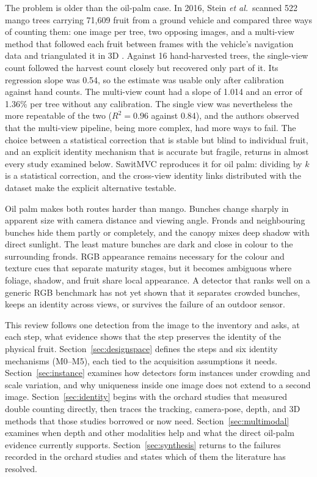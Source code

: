 The problem is older than the oil-palm case. In 2016, Stein \textit{et al.}\ scanned 522 mango trees carrying 71{,}609 fruit from a ground vehicle and compared three ways of counting them: one image per tree, two opposing images, and a multi-view method that followed each fruit between frames with the vehicle's navigation data and triangulated it in 3D \cite{ledger_r_408d13511cac4177}. Against 16 hand-harvested trees, the single-view count followed the harvest count closely but recovered only part of it. Its regression slope was 0.54, so the estimate was usable only after calibration against hand counts. The multi-view count had a slope of 1.014 and an error of 1.36\% per tree without any calibration. The single view was nevertheless the more repeatable of the two ($R^2=0.96$ against 0.84), and the authors observed that the multi-view pipeline, being more complex, had more ways to fail. The choice between a statistical correction that is stable but blind to individual fruit, and an explicit identity mechanism that is accurate but fragile, returns in almost every study examined below. SawitMVC reproduces it for oil palm: dividing by $k$ is a statistical correction, and the cross-view identity links distributed with the dataset make the explicit alternative testable.

Oil palm makes both routes harder than mango. Bunches change sharply in apparent size with camera distance and viewing angle. Fronds and neighbouring bunches hide them partly or completely, and the canopy mixes deep shadow with direct sunlight. The least mature bunches are dark and close in colour to the surrounding fronds. RGB appearance remains necessary for the colour and texture cues that separate maturity stages, but it becomes ambiguous where foliage, shadow, and fruit share local appearance. A detector that ranks well on a generic RGB benchmark has not yet shown that it separates crowded bunches, keeps an identity across views, or survives the failure of an outdoor sensor.

This review follows one detection from the image to the inventory and asks, at each step, what evidence shows that the step preserves the identity of the physical fruit. Section~\ref{sec:designspace} defines the steps and six identity mechanisms (M0--M5), each tied to the acquisition assumptions it needs. Section~\ref{sec:instance} examines how detectors form instances under crowding and scale variation, and why uniqueness inside one image does not extend to a second image. Section~\ref{sec:identity} begins with the orchard studies that measured double counting directly, then traces the tracking, camera-pose, depth, and 3D methods that those studies borrowed or now need. Section~\ref{sec:multimodal} examines when depth and other modalities help and what the direct oil-palm evidence currently supports. Section~\ref{sec:synthesis} returns to the failures recorded in the orchard studies and states which of them the literature has resolved.

